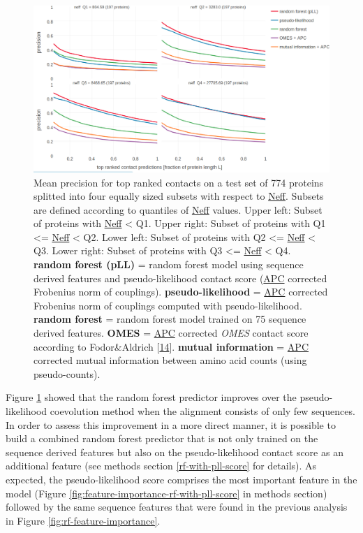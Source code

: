\documentclass[12pt,a4paper,twoside]{book}
\theoremstyle{definition}
\theoremstyle{definition}
\theoremstyle{remark}
\begin{document}
\begin{figure}
\includegraphics[width=1\linewidth]{img/random_forest_contact_prior/precision_vs_rank_facetted_by_neff_notitle} \caption{Mean precision for top ranked contacts
on a test set of 774 proteins splitted into four equally sized subsets
with respect to \protect\hyperlink{abbrev}{Neff}. Subsets are defined
according to quantiles of \protect\hyperlink{abbrev}{Neff} values. Upper
left: Subset of proteins with \protect\hyperlink{abbrev}{Neff}
\textless{} Q1. Upper right: Subset of proteins with Q1 \textless{}=
\protect\hyperlink{abbrev}{Neff} \textless{} Q2. Lower left: Subset of
proteins with Q2 \textless{}= \protect\hyperlink{abbrev}{Neff}
\textless{} Q3. Lower right: Subset of proteins with Q3 \textless{}=
\protect\hyperlink{abbrev}{Neff} \textless{} Q4. \textbf{random forest
(pLL)} = random forest model using sequence derived features and
pseudo-likelihood contact score (\protect\hyperlink{abbrev}{APC}
corrected Frobenius norm of couplings). \textbf{pseudo-likelihood} =
\protect\hyperlink{abbrev}{APC} corrected Frobenius norm of couplings
computed with pseudo-likelihood. \textbf{random forest} = random forest
model trained on 75 sequence derived features. \textbf{OMES} =
\protect\hyperlink{abbrev}{APC} corrected \emph{OMES} contact score
according to Fodor\&Aldrich
{[}\protect\hyperlink{ref-Fodor2004a}{14}{]}. \textbf{mutual
information} = \protect\hyperlink{abbrev}{APC} corrected mutual
information between amino acid counts (using pseudo-counts).}\label{fig:performance-neff-rf}
\end{figure}

Figure \ref{fig:performance-neff-rf} showed that the random forest
predictor improves over the pseudo-likelihood coevolution method when
the alignment consists of only few sequences. In order to assess this
improvement in a more direct manner, it is possible to build a combined
random forest predictor that is not only trained on the sequence derived
features but also on the pseudo-likelihood contact score as an
additional feature (see methods section \ref{rf-with-pll-score} for
details). As expected, the pseudo-likelihood score comprises the most
important feature in the model (Figure
\ref{fig:feature-importance-rf-with-pll-score} in methods section)
followed by the same sequence features that were found in the previous
analysis in Figure \ref{fig:rf-feature-importance}.
\end{document}
